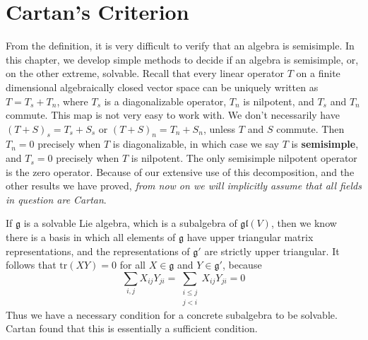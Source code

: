 \section{Cartan's Criterion}

From the definition, it is very difficult to verify that an algebra is semisimple. In this chapter, we develop simple methods to decide if an algebra is semisimple, or, on the other extreme, solvable. Recall that every linear operator $T$ on a finite dimensional algebraically closed vector space can be uniquely written as $T = T_s + T_n$, where $T_s$ is a diagonalizable operator, $T_n$ is nilpotent, and $T_s$ and $T_n$ commute. This map is not very easy to work with. We don't necessarily have $(T + S)_s = T_s + S_s$ or $(T + S)_n = T_n + S_n$, unless $T$ and $S$ commute. Then $T_n = 0$ precisely when $T$ is diagonalizable, in which case we say $T$ is {\bf semisimple}, and $T_s = 0$ precisely when $T$ is nilpotent. The only semisimple nilpotent operator is the zero operator. Because of our extensive use of this decomposition, and the other results we have proved, {\it from now on we will implicitly assume that all fields in question are Cartan}.

If $\mathfrak{g}$ is a solvable Lie algebra, which is a subalgebra of $\mathfrak{gl}(V)$, then we know there is a basis in which all elements of $\mathfrak{g}$ have upper triangular matrix representations, and the representations of $\mathfrak{g}'$ are strictly upper triangular. It follows that $\text{tr}(XY) = 0$ for all $X \in \mathfrak{g}$ and $Y \in \mathfrak{g}'$, because
%
\[ \sum_{i,j} X_{ij}Y_{ji} = \sum_{\substack{i \leq j\\j < i}} X_{ij} Y_{ji} = 0 \]
%
Thus we have a necessary condition for a concrete subalgebra to be solvable. Cartan found that this is essentially a sufficient condition.

